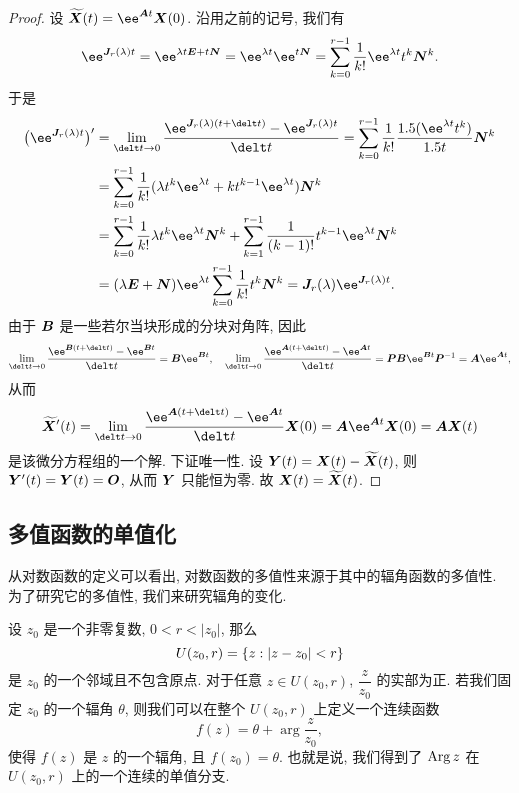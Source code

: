 \begin{proof}
  设 $\wt\bfX(t)=\ee^{\bfA t}\bfX(0)$.
  沿用之前的记号, 我们有
  \[
     \ee^{\bfJ_r(\lambda)t}
    =\ee^{\lambda t\bfE+t\bfN}
    =\ee^{\lambda t}\ee^{t\bfN}
    =\sum_{k=0}^{r-1}\frac1{k!}\ee^{\lambda t}t^k\bfN^k.
  \]
  于是
  \begin{align*}
      \bigl(\ee^{\bfJ_r(\lambda)t}\bigr)'&
    =\lim_{\delt t\ra 0}\frac{\ee^{\bfJ_r(\lambda)(t+\delt t)}-\ee^{\bfJ_r(\lambda)t}}{\delt t}
    =\sum_{k=0}^{r-1}\frac1{k!}\frac{\d(\ee^{\lambda t}t^k)}{\d t}\bfN^k\\&
    =\sum_{k=0}^{r-1}\frac1{k!}(\lambda t^k\ee^{\lambda t}+kt^{k-1}\ee^{\lambda t})\bfN^k\\&
    =\sum_{k=0}^{r-1}\frac1{k!}\lambda t^k\ee^{\lambda t}\bfN^k+\sum_{k=1}^{r-1}\frac1{(k-1)!}t^{k-1}\ee^{\lambda t}\bfN^k\\&
    =(\lambda\bfE+\bfN)\ee^{\lambda t}\sum_{k=0}^{r-1}\frac1{k!}t^k\bfN^k
    =\bfJ_r(\lambda)\ee^{\bfJ_r(\lambda)t}.
  \end{align*}
  由于 ${\boldsymbol{B}}$ 是一些若尔当块形成的分块对角阵, 因此
  \[
     \lim_{\delt t\ra 0}\frac{\ee^{\bfB(t+\delt t)}-\ee^{\bfB t}}{\delt t}
    =\bfB\ee^{\bfB t},\quad
     \lim_{\delt t\ra 0}\frac{\ee^{\bfA(t+\delt t)}-\ee^{\bfA t}}{\delt t}
    =\bfP\bfB\ee^{\bfB t}\bfP^{-1}
    =\bfA\ee^{\bfA t},
  \]
  从而
  \[
     \wt\bfX'(t)
    =\lim_{\delt t\ra 0}\frac{\ee^{\bfA(t+\delt t)}-\ee^{\bfA t}}{\delt t}\bfX(0)
    =\bfA\ee^{\bfA t}\bfX(0)
    =\bfA\bfX(t)
  \]
  是该微分方程组的一个解.
  下证唯一性.
  设 ${\boldsymbol{Y}}(t)={\boldsymbol{X}}(t)-\widetilde{{\boldsymbol{X}}}(t)$, 则 ${\boldsymbol{Y}}'(t)={\boldsymbol{Y}}(t)={\boldsymbol{O}}$, 从而 ${\boldsymbol{Y}}$ 只能恒为零.
  故 ${\boldsymbol{X}}(t)=\widetilde{{\boldsymbol{X}}}(t)$.
\end{proof}



\subsection{多值函数的单值化\optional}

从对数函数的定义可以看出, 对数函数的多值性来源于其中的辐角函数的多值性.
为了研究它的多值性, 我们来研究辐角的变化.

设 $z_0$ 是一个非零复数, $0<r<|z_0|$, 那么
\[
  U(z_0,r)={\left\{z:|z-z_0|<r\right\}}
\]
是 $z_0$ 的一个邻域且不包含原点.
对于任意 $z\in U(z_0,r)$, $\dfrac z{z_0}$ 的实部为正.
若我们固定 $z_0$ 的一个辐角 $\theta$, 则我们可以在整个 $U(z_0,r)$ 上定义一个连续函数
\[
  f(z)=\theta+\arg\frac z{z_0},
\]
使得 $f(z)$ 是 $z$ 的一个辐角, 且 $f(z_0)=\theta$.
也就是说, 我们得到了 $\operatorname{Arg} z$ 在 $U(z_0,r)$ 上的一个连续的单值分支.

